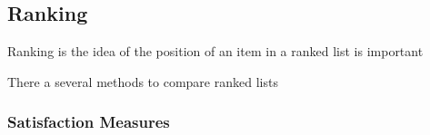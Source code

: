 \subsection{Ranking}
Ranking is the idea of the position of an item in a ranked list is important 

There a several methods to compare ranked lists


\subsubsection{Satisfaction Measures}

